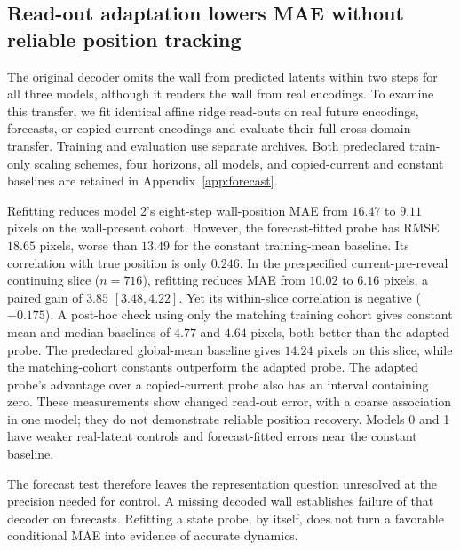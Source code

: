 \subsection{Read-out adaptation lowers MAE without reliable position tracking}
\label{sec:forecast-result}

The original decoder omits the wall from predicted latents within two steps for all three models,
although it renders the wall from real encodings. To examine this transfer, we fit identical affine
ridge read-outs on real future encodings, forecasts, or copied current encodings and evaluate their
full cross-domain transfer. Training and evaluation use separate archives. Both predeclared
train-only scaling schemes, four horizons, all models, and copied-current and constant baselines
are retained in Appendix~\ref{app:forecast}.

Refitting reduces model 2's eight-step wall-position MAE from $16.47$ to $9.11$ pixels on the
wall-present cohort. However, the forecast-fitted probe has RMSE $18.65$ pixels, worse than $13.49$
for the constant training-mean baseline. Its correlation with true position is only $0.246$.
In the prespecified current-pre-reveal continuing slice ($n=716$), refitting reduces MAE from
$10.02$ to $6.16$ pixels, a paired gain of $3.85$ $[3.48,4.22]$. Yet its within-slice correlation
is negative ($-0.175$). A post-hoc check using only the matching training cohort gives constant
mean and median baselines of $4.77$ and $4.64$ pixels, both better than the adapted probe. The
predeclared global-mean baseline gives $14.24$ pixels on this slice, while the matching-cohort
constants outperform the adapted probe. The adapted probe's advantage over a copied-current probe
also has an interval containing zero. These measurements show changed read-out error, with a coarse
association in one model; they do not demonstrate reliable position recovery. Models 0 and 1 have
weaker real-latent controls and forecast-fitted errors near the constant baseline.

The forecast test therefore leaves the representation question unresolved at the precision needed
for control. A missing decoded wall establishes failure of that decoder on forecasts. Refitting a
state probe, by itself, does not turn a favorable conditional MAE into evidence of accurate dynamics.
